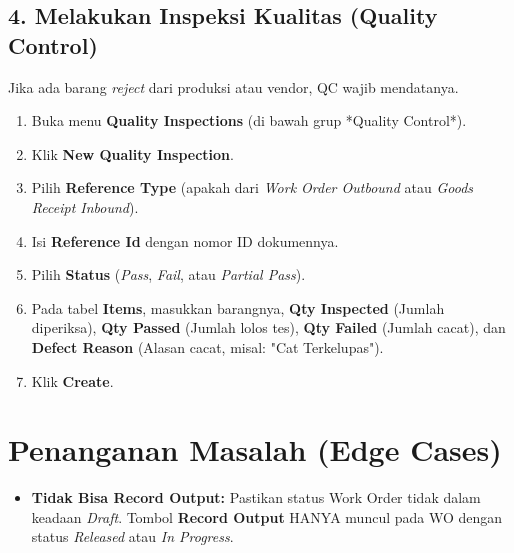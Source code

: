 \subsection{4. Melakukan Inspeksi Kualitas (Quality Control)}
Jika ada barang \textit{reject} dari produksi atau vendor, QC wajib mendatanya.
\begin{enumerate}
    \item Buka menu \textbf{Quality Inspections} (di bawah grup *Quality Control*).
    \item Klik \textbf{New Quality Inspection}.
    \item Pilih \textbf{Reference Type} (apakah dari \textit{Work Order Outbound} atau \textit{Goods Receipt Inbound}).
    \item Isi \textbf{Reference Id} dengan nomor ID dokumennya.
    \item Pilih \textbf{Status} (\textit{Pass}, \textit{Fail}, atau \textit{Partial Pass}).
    \item Pada tabel \textbf{Items}, masukkan barangnya, \textbf{Qty Inspected} (Jumlah diperiksa), \textbf{Qty Passed} (Jumlah lolos tes), \textbf{Qty Failed} (Jumlah cacat), dan \textbf{Defect Reason} (Alasan cacat, misal: "Cat Terkelupas").
    \item Klik \textbf{Create}.
\end{enumerate}

\section{Penanganan Masalah (Edge Cases)}
\begin{itemize}
    \item \textbf{Tidak Bisa Record Output:} Pastikan status Work Order tidak dalam keadaan \textit{Draft}. Tombol \textbf{Record Output} HANYA muncul pada WO dengan status \textit{Released} atau \textit{In Progress}.
\end{itemize}
